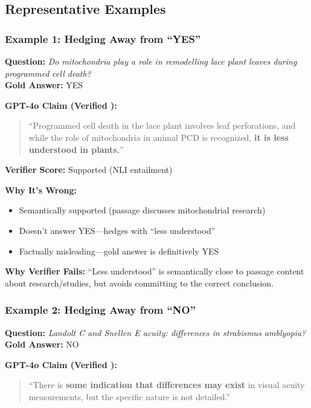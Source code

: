 \documentclass[11pt]{article}
\begin{document}
\subsection{Representative Examples}

\subsubsection{Example 1: Hedging Away from ``YES''}

\textbf{Question:} \textit{Do mitochondria play a role in remodelling lace plant leaves during programmed cell death?}\\
\textbf{Gold Answer:} YES

\textbf{GPT-4o Claim (Verified \checkmark):}
\begin{quote}
``Programmed cell death in the lace plant involves leaf perforations, and while the role of mitochondria in animal PCD is recognized, \textbf{it is less understood in plants.}''
\end{quote}

\textbf{Verifier Score:} \checkmark Supported (NLI entailment)

\textbf{Why It's Wrong:}
\begin{itemize}
\item[\checkmark] Semantically supported (passage discusses mitochondrial research)
\item[\texttimes] Doesn't answer YES—hedges with ``less understood''
\item[\texttimes] Factually misleading—gold answer is definitively YES
\end{itemize}

\textbf{Why Verifier Fails:} ``Less understood'' is semantically close to passage content about research/studies, but avoids committing to the correct conclusion.

\subsubsection{Example 2: Hedging Away from ``NO''}

\textbf{Question:} \textit{Landolt C and Snellen E acuity: differences in strabismus amblyopia?}\\
\textbf{Gold Answer:} NO

\textbf{GPT-4o Claim (Verified \checkmark):}
\begin{quote}
``There is \textbf{some indication that differences may exist} in visual acuity measurements, but the specific nature is not detailed.''
\end{quote}
\end{document}
